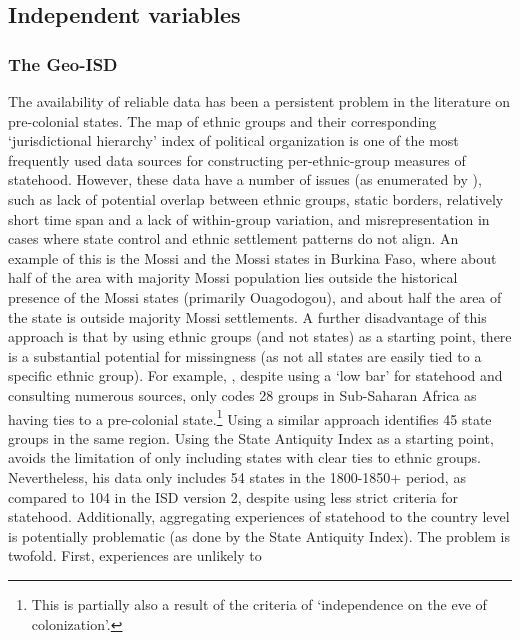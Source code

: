 \documentclass[12pt]{article}
\begin{document}
\subsection{Independent variables} \label{Independent variable}

\subsubsection{The Geo-ISD} \label{The Geo-ISD}

The availability of reliable data has been a persistent problem in the
literature on pre-colonial states. The \citet{Murdock1967} map of ethnic groups
and their corresponding `jurisdictional hierarchy' index of political
organization is one of the most frequently used data sources for constructing
per-ethnic-group measures of statehood. However, these data have a number of
issues (as enumerated by \citet{Michalopoulos2018}), such as lack of potential
overlap between ethnic groups, static borders, relatively short time span and a
lack of within-group variation, and misrepresentation in cases where state
control and ethnic settlement patterns do not align. An example of this is the
Mossi and the Mossi states in Burkina Faso, where about half of the area with
majority Mossi population lies outside the historical presence of the Mossi
states (primarily Ouagodogou), and about half the area of the state is outside
majority Mossi settlements. A further disadvantage of this approach is that by
using ethnic groups (and not states) as a starting point, there is a substantial
potential for missingness (as not all states are easily tied to a specific
ethnic group). For example, \citet{Paine2019}, despite using a `low bar' for
statehood and consulting numerous sources, only codes 28 groups in Sub-Saharan
Africa as having ties to a pre-colonial state.\footnote{This is partially also a
result of the criteria of `independence on the eve of colonization'.} Using a
similar approach \citet{Wig2016} identifies 45 state groups in the same region.
Using the State Antiquity Index \citep{Bockstette2002} as a starting point,
\citet{Depetris-Chauvin2016} avoids the limitation of only including states with
clear ties to ethnic groups. Nevertheless, his data only includes 54 states in
the 1800-1850+ period, as compared to 104 in the ISD version 2, despite using
less strict criteria for statehood. Additionally, aggregating experiences of
statehood to the country level is potentially problematic (as done by the State
Antiquity Index). The problem is twofold. First, experiences are unlikely to
\end{document}
